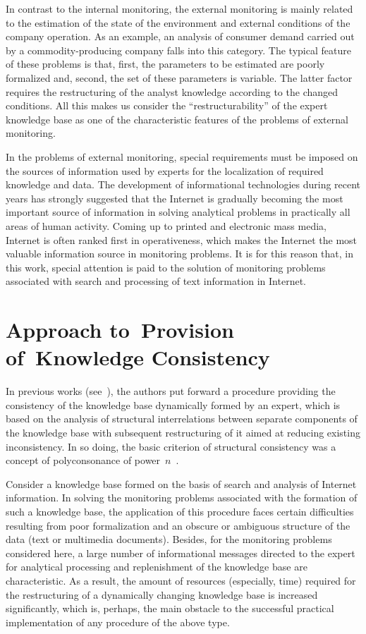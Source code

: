 \begin{multicols}{2}
     In contrast to the internal monitoring, the external monitoring is mainly 
related to the estimation of the state of the environment and external conditions of 
the company operation. As an example, an analysis of consumer demand carried 
out by a commodity-producing company falls into this category. The typical 
feature of these problems is that, first, the parameters to be estimated are poorly 
formalized and, second, the set of these parameters is variable. The latter factor 
requires the restructuring of the analyst knowledge according to the changed 
conditions. All this makes us consider the ``restructurability'' of the expert 
knowledge base as one of the characteristic features of the problems of external 
monitoring.
     
     In the problems of external monitoring, special requirements must be 
imposed on the sources of information used by experts for the localization of 
required knowledge and data. The development of informational technologies 
during recent years has strongly suggested that the Internet is gradually becoming 
the most important source of information in solving analytical problems in 
practically all areas of human activity. Coming up to printed and electronic mass 
media, Internet is often ranked first in operativeness, which makes the Internet the 
most valuable information source in monitoring problems. It is for this reason that, 
in this work, special attention is paid to the solution of monitoring problems 
associated with search and processing of text information in Internet.
     
     \section{Approach to~Provision of~Knowledge Consistency}
     
     \noindent
     In previous works (see~\cite{4-d, 7-d, 6-d}), the authors put forward a procedure 
providing the consistency of the knowledge base dynamically formed by an 
expert, which is based on the analysis of structural interrelations between separate 
components of the knowledge base with subsequent restructuring of it aimed at 
reducing existing inconsistency. In so doing, the basic criterion of structural 
consistency was a concept of polyconsonance of power~$n$~\cite{2-d}.
     
     Consider a knowledge base formed on the basis of search and analysis of 
Internet information. In solving the monitoring problems associated with the 
formation of such a knowledge base, the application of this procedure faces certain 
difficulties resulting from poor formalization and an obscure or ambiguous 
structure of the data (text or multimedia documents). Besides, for the monitoring 
problems considered here, a large number of informational messages directed to the 
expert for analytical processing and replenishment of the knowledge base are 
characteristic. As a result, the amount of resources (especially, time) required for 
the restructuring of a dynamically changing knowledge base is increased 
significantly, which is, perhaps, the main obstacle to the successful practical 
implementation of any procedure of the above type.
     

\end{multicols}
